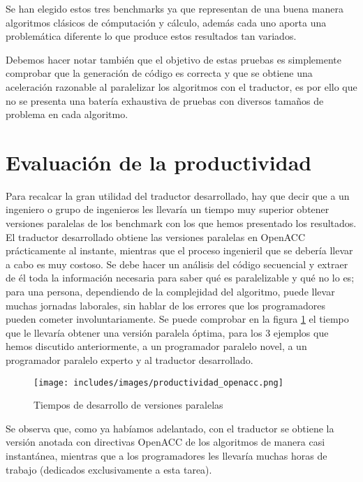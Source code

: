 Se han elegido estos tres benchmarks ya que representan de una buena manera algoritmos clásicos de cómputación y cálculo, además cada uno aporta una problemática diferente lo que produce estos resultados tan variados.

Debemos hacer notar también que el objetivo de estas pruebas es simplemente comprobar que la generación de código es correcta y que se obtiene una aceleración razonable al paralelizar los algoritmos con el traductor, es por ello que no se presenta una batería exhaustiva de pruebas con diversos tamaños de problema en cada algoritmo. 

\section{Evaluación de la productividad}
Para recalcar la gran utilidad del traductor desarrollado, hay que decir que a un ingeniero o grupo de ingenieros les llevaría un tiempo muy superior obtener versiones paralelas de los benchmark con los que hemos presentado los resultados. El traductor desarrollado obtiene las versiones paralelas en OpenACC prácticamente al instante, mientras que el proceso ingenieril que se debería llevar a cabo es muy costoso. Se debe hacer un análisis del código secuencial y extraer de él toda la información necesaria para saber qué es paralelizable y qué no lo es; para una persona, dependiendo de la complejidad del algoritmo, puede llevar muchas jornadas laborales, sin hablar de los errores que los programadores pueden cometer involuntariamente.
Se puede comprobar en la figura \ref{fig:productividad_openacc} el tiempo que le llevaría obtener una versión paralela óptima, para los 3 ejemplos que hemos discutido anteriormente, a un programador paralelo novel, a un programador paralelo experto y al traductor desarrollado.

\begin{figure}[t]
\begin{center}
\texttt{[image: includes/images/productividad\_openacc.png]}
\caption{Tiempos de desarrollo de versiones paralelas}
\label{fig:productividad_openacc}
\end{center}
\end{figure}

Se observa que, como ya habíamos adelantado, con el traductor se obtiene la versión anotada con directivas OpenACC de los algoritmos de manera casi instantánea, mientras que a los programadores les llevaría muchas horas de trabajo (dedicados exclusivamente a esta tarea).

